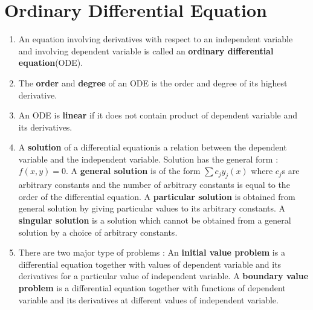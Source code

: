 \section{Ordinary Differential Equation}
\begin{enumerate}
	\item An equation involving derivatives with respect to an independent variable and involving dependent variable is called an \textbf{ordinary differential equation}(ODE).
	\item  The \textbf{order} and \textbf{degree} of an ODE is the order and degree of its highest derivative.
	\item An ODE is \textbf{linear} if it does not contain product of dependent variable and its derivatives.
	\item A \textbf{solution} of a differential equationis a relation between the dependent variable and the independent variable. Solution has the general form : $f(x,y) = 0$.
		\subitem A \textbf{general solution} is of the form $\sum c_jy_j(x)$ where $c_j$s are arbitrary constants and the number of arbitrary constants is equal to the order of the differential equation.
		\subitem A \textbf{particular solution} is obtained from general solution by giving particular values to its arbitrary constants.
		\subitem A \textbf{singular solution} is a solution which cannot be obtained from a general solution by a choice of arbitrary constants.
	\item There are two major type of problems :
		\subitem An \textbf{initial value problem} is a differential equation together with values of dependent variable and its derivatives for a particular value of independent variable. 
		\subitem A \textbf{boundary value problem} is a differential equation together with functions of dependent variable and its derivatives at different values of independent variable.
\end{enumerate}


